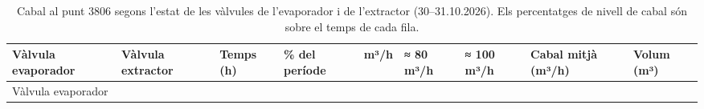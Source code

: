 \documentclass[
  paper=a4,
  oneside  ,captions=tableheading
]{scrartcl}
\begin{document}
\begin{longtable}[]{@{}
  >{\raggedright\arraybackslash}p{}
  >{\raggedright\arraybackslash}p{}
  >{\raggedleft\arraybackslash}p{}
  >{\raggedleft\arraybackslash}p{}
  >{\raggedleft\arraybackslash}p{}
  >{\raggedleft\arraybackslash}p{}
  >{\raggedleft\arraybackslash}p{}
  >{\raggedleft\arraybackslash}p{}
  >{\raggedleft\arraybackslash}p{}@{}}
\caption{Cabal al punt 3806 segons l'estat de les vàlvules de
l'evaporador i de l'extractor (30--31.10.2026). Els percentatges de
nivell de cabal són sobre el temps de cada
fila.}\label{tbl-cabal-estat-valvules}\tabularnewline
\toprule\noalign{}
\begin{minipage}[b]{\linewidth}\raggedright
Vàlvula evaporador
\end{minipage} & \begin{minipage}[b]{\linewidth}\raggedright
Vàlvula extractor
\end{minipage} & \begin{minipage}[b]{\linewidth}\raggedleft
Temps (h)
\end{minipage} & \begin{minipage}[b]{\linewidth}\raggedleft
\% del període
\end{minipage} & \begin{minipage}[b]{\linewidth}\raggedleft
0 m³/h
\end{minipage} & \begin{minipage}[b]{\linewidth}\raggedleft
≈ 80 m³/h
\end{minipage} & \begin{minipage}[b]{\linewidth}\raggedleft
≈ 100 m³/h
\end{minipage} & \begin{minipage}[b]{\linewidth}\raggedleft
Cabal mitjà (m³/h)
\end{minipage} & \begin{minipage}[b]{\linewidth}\raggedleft
Volum (m³)
\end{minipage} \\
\midrule\noalign{}
\endfirsthead
\toprule\noalign{}
\begin{minipage}[b]{\linewidth}\raggedright
Vàlvula evaporador
\end{minipage} & \begin{minipage}[b]{\linewidth}\raggedright

\end{minipage}
\end{longtable}
\end{document}
